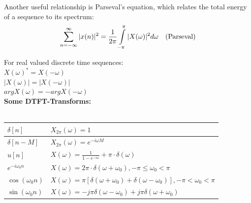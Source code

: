Another useful relationship is Parseval’s equation, which relates the total energy of a sequence to its spectrum: 
\begin{align}
\sum_{n=-\infty}^{\infty} |x(n)|^2= \frac{1}{2\pi} \int\limits_{-\pi}^{\pi} |X(\omega)|^2 d\omega && \text{(Parseval)} \notag
\end{align}

For real valued discrete time sequences:\\
	$X(\omega)^* = X(-\omega)$ \\
	$|X(\omega)| = |X(-\omega)|$\\
	$argX(\omega) = -argX(-\omega)$\\

\textbf{Some DTFT-Transforms:}\\ \\

\begin{tabularx}{0.7\textwidth}{|l|X|}
	\hline
	$\delta[n]$ &	$X_{2\pi}(\omega) = 1$ \\
	\hline 	
	$\delta[n-M]$ &	$X_{2\pi}(\omega) = e^{-i\omega M}$ \\
	\hline
	$u[n]$ & %
	$X(\omega) = \frac{1}{1-e^{-i \omega}} + \pi \cdot \delta (\omega) $ \\
	\hline
	$e^{-i \omega_0 n}$ &	$X(\omega) = 2\pi\cdot \delta (\omega +\omega_0),     -\pi \leq \omega_0 < \pi$ \\
	\hline
	$\cos(\omega_0 n) $ & $X(\omega) = \pi [\delta (\omega +\omega_0)+\delta (\omega -\omega_0)],     -\pi < \omega_0 < \pi $\\
	\hline
	$\sin(\omega_0 n) $ & $X(\omega) = -j \pi \delta(\omega - \omega_0) + j \pi \delta(\omega + \omega_0)$\\
	\hline
\end{tabularx} \\ \\

\newpage

